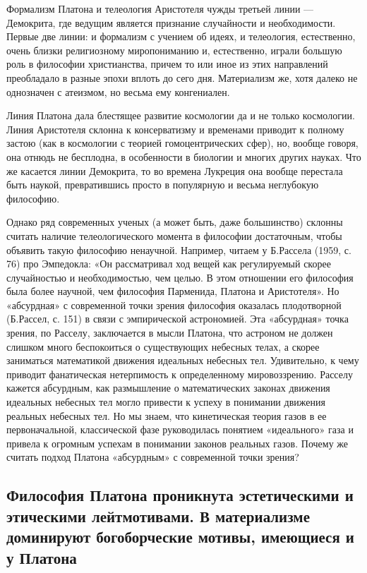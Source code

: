 Формализм Платона и телеология Аристотеля чужды третьей линии ---
Демокрита, где ведущим является признание случайности и необходимости.
Первые две линии: и формализм с учением об идеях, и телеология,
естественно, очень близки религиозному миропониманию и, естественно,
играли большую роль в философии христианства, причем то или иное из
этих направлений преобладало в разные эпохи вплоть до сего дня.
Материализм же, хотя далеко не однозначен с атеизмом, но весьма ему
конгениален.

Линия Платона дала блестящее развитие космологии да и не только
космологии. Линия Аристотеля склонна к консерватизму и временами
приводит к полному застою (как в космологии с теорией гомоцентрических
сфер), но, вообще говоря, она отнюдь не бесплодна, в особенности в
биологии и многих других науках. Что же касается линии Демокрита, то
во времена Лукреция она вообще перестала быть наукой, превратившись
просто в популярную и весьма неглубокую философию.

Однако ряд современных ученых (а может быть, даже большинство) склонны
считать наличие телеологического момента в философии достаточным,
чтобы объявить такую философию ненаучной. Например, читаем у Б.Рассела
(1959, с. 76) про Эмпедокла: «Он рассматривал ход вещей как
регулируемый скорее случайностью и необходимостью, чем целью. В этом
отношении его философия была более научной, чем философия Парменида,
Платона и Аристотеля». Но «абсурдная» с современной точки зрения
философия оказалась плодотворной (Б.Рассел, с. 151) в связи с
эмпирической астрономией. Эта «абсурдная» точка зрения, по Расселу,
заключается в мысли Платона, что астроном не должен слишком много
беспокоиться о существующих небесных телах, а скорее заниматься
математикой движения идеальных небесных тел. Удивительно, к чему
приводит фанатическая нетерпимость к определенному мировоззрению.
Расселу кажется абсурдным, как размышление о математических законах
движения идеальных небесных тел могло привести к успеху в понимании
движения реальных небесных тел. Но мы знаем, что кинетическая теория
газов в ее первоначальной, классической фазе руководилась понятием
«идеального» газа и привела к огромным успехам в понимании законов
реальных газов. Почему же считать подход Платона «абсурдным» с
современной точки зрения?

\subsection{Философия Платона проникнута эстетическими и этическими
лейтмотивами. В материализме доминируют богоборческие мотивы,
имеющиеся и у Платона}

